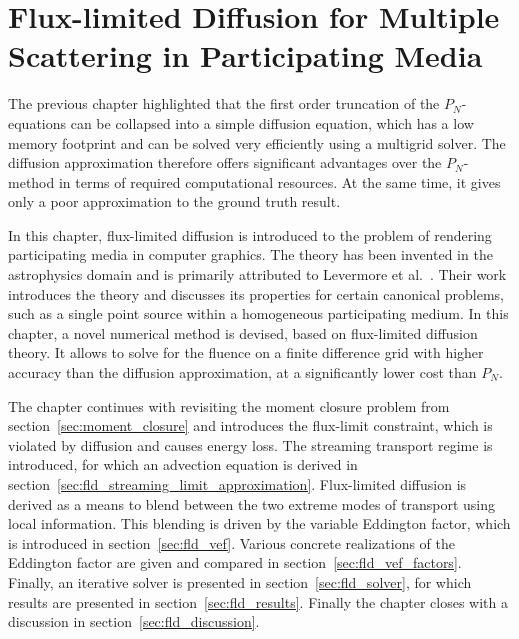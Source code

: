 \chapter[FLD for Multiple Scattering in Participating Media]{Flux-limited Diffusion for Multiple Scattering in Participating Media}
\label{sec:fld}

The previous chapter highlighted that the first order truncation of the $P_N$-equations can be collapsed into a simple diffusion equation, which has a low memory footprint and can be solved very efficiently using a multigrid solver. The diffusion approximation therefore offers significant advantages over the $P_N$-method in terms of required computational resources. At the same time, it gives only a poor approximation to the ground truth result.

In this chapter, flux-limited diffusion is introduced to the problem of rendering participating media in computer graphics. The theory has been invented in the astrophysics domain and is primarily attributed to Levermore et al.~\cite{Levermore81}. Their work introduces the theory and discusses its properties for certain canonical problems, such as a single point source within a homogeneous participating medium. In this chapter, a novel numerical method is devised, based on flux-limited diffusion theory. It allows to solve for the fluence on a finite difference grid with higher accuracy than the diffusion approximation, at a significantly lower cost than $P_N$.

The chapter continues with revisiting the moment closure problem from section~\ref{sec:moment_closure} and introduces the flux-limit constraint, which is violated by diffusion and causes energy loss. The streaming transport regime is introduced, for which an advection equation is derived in section~\ref{sec:fld_streaming_limit_approximation}. Flux-limited diffusion is derived as a means to blend between the two extreme modes of transport using local information. This blending is driven by the variable Eddington factor, which is introduced in section~\ref{sec:fld_vef}. Various concrete realizations of the Eddington factor are given and compared in section~\ref{sec:fld_vef_factors}. Finally, an iterative solver is presented in section~\ref{sec:fld_solver}, for which results are presented in section~\ref{sec:fld_results}. Finally the chapter closes with a discussion in section~\ref{sec:fld_discussion}.













